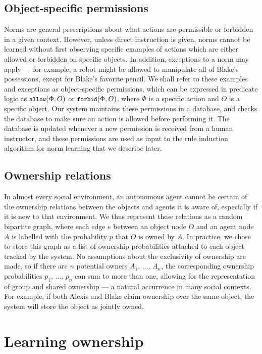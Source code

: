 \documentclass[letterpaper]{article} %
\begin{document}
\subsection{Object-specific permissions}

Norms are general prescriptions about what actions are permissible or forbidden in a given context. However, unless direct instruction is given, norms cannot be learned without first observing specific examples of actions which are either allowed or forbidden on specific objects. In addition, exceptions to a norm may apply --- for example, a robot might be allowed to manipulate all of Blake's possessions, except for Blake's favorite pencil. We shall refer to these examples and exceptions as object-specific permissions, which can be expressed in predicate logic as $\small\texttt{allow}(\Phi, O)$ or $\small\texttt{forbid}(\Phi, O)$, where $\Phi$ is a specific action and $O$ is a specific object. Our system maintains these permissions in a database, and checks the database to make sure an action is allowed before performing it. The database is updated whenever a new permission is received from a human instructor, and these permissions are used as input to the rule induction algorithm for norm learning that we describe later.

\subsection{Ownership relations}

In almost every social environment, an autonomous agent cannot be certain of the ownership relations between the objects and agents it is aware of, especially if it is new to that environment. We thus represent these relations as a random bipartite graph, where each edge $e$ between an object node $O$ and an agent node $A$ is labelled with the probability $p$ that $O$ is owned by $A$. In practice, we chose to store this graph as a list of ownership probabilities attached to each object tracked by the system. No assumptions about the exclusivity of ownership are made, so if there are $n$ potential owners $A_1$, ..., $A_n$, the corresponding ownership probabilities $p_1$, ..., $p_n$ can sum to more than one, allowing for the representation of group and shared ownership --- a natural occurrence in many social contexts. For example, if both Alexis and Blake claim ownership over the same object, the system will store the object  as jointly owned. 

\section{Learning ownership}
\end{document}
